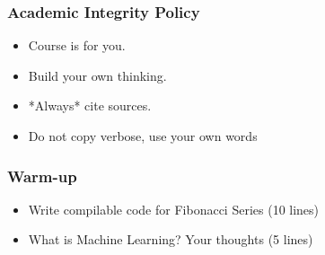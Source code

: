 \begin{frame}[fragile]\frametitle{Academic Integrity Policy}
\begin{itemize}
\item Course is for you.
\item Build your own thinking.
\item *Always* cite sources.
\item Do not copy verbose, use your own words
\end{itemize}
\end{frame}


\begin{frame}[fragile]\frametitle{Warm-up}
\begin{itemize}
\item Write compilable code for Fibonacci Series (10 lines)
\item What is Machine Learning? Your thoughts (5 lines)
\end{itemize}
\end{frame}
